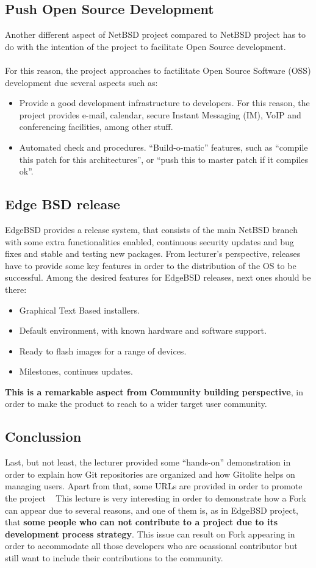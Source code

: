 \documentclass[11pt]{article}
\begin{document}
\subsection{Push Open Source Development}
Another different aspect of NetBSD project compared to NetBSD project has to do with the intention of the project to facilitate Open Source development.\\
\\
For this reason, the project approaches to factilitate Open Source Software (OSS) development due several aspects such as:
\begin{itemize}
\item{Provide a good development infrastructure to developers}. For this reason, the project provides e-mail, calendar, secure Instant Messaging (IM), VoIP and conferencing facilities, among other stuff.
\item{Automated check and procedures}. ``Build-o-matic'' features, such as ``compile this patch for this architectures'', or ``push this to master patch if it compiles ok''.
\end{itemize}

\subsection{Edge BSD release}
EdgeBSD provides a release system, that consists of the main NetBSD branch with some extra functionalities enabled, continuous security updates and bug fixes and stable and testing new packages.
From lecturer's perspective, releases have to provide some key features in order to the distribution of the OS to be successful. Among the desired features for EdgeBSD releases, next ones should be there:
\begin{itemize}
\item{Graphical Text Based installers}.
\item{Default environment, with known hardware and software support}.
\item{Ready to flash images for a range of devices}.
\item{Milestones, continues updates}.
\end{itemize}
\textbf{This is a remarkable aspect from Community building perspective}, in order to make the product to reach to a wider target user community.

\subsection{Conclussion}
Last, but not least, the lecturer provided some ``hands-on'' demonstration in order to explain how Git repositories are organized and how Gitolite helps on managing users. Apart from that, some URLs are provided in order to promote the project ~\cite{EDGE00}
This lecture is very interesting in order to demonstrate how a Fork can appear due to several reasons, and one of them is, as in EdgeBSD project, that \textbf{some people who can not contribute to a project due to its development process strategy}. This issue can result on Fork appearing in order to accommodate all those developers who are ocassional contributor but still want to include their contributions to the community.
\end{document}
